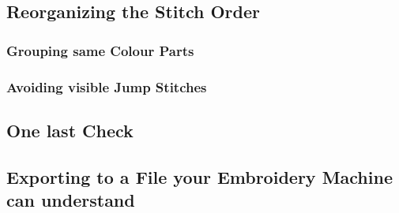 \documentclass{article}
\begin{document}
        \subsection{Reorganizing the Stitch Order}
            \subsubsection{Grouping same Colour Parts}
            \subsubsection{Avoiding visible Jump Stitches}
        
        \subsection{One last Check}
        
        \subsection{Exporting to a File your Embroidery Machine can understand}
\end{document}
